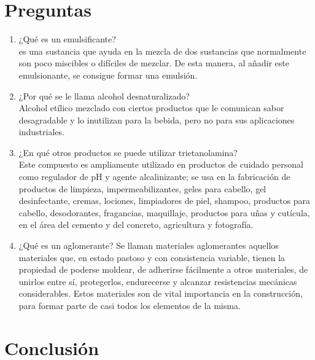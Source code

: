 \documentclass[12pt]{article}
\begin{document}
\section{Preguntas}
\begin{enumerate}
	\item ¿Qué es un emulsificante?\\
	es una sustancia que ayuda en la mezcla de dos sustancias que normalmente son poco miscibles o difíciles de mezclar. De esta manera, al añadir este emulsionante, se consigue formar una emulsión.
	\item ¿Por qué se le llama alcohol desnaturalizado?\\
	Alcohol etílico mezclado con ciertos productos que le comunican sabor desagradable y lo inutilizan para la bebida, pero no para sus aplicaciones industriales.
	\item ¿En qué otros productos se puede utilizar trietanolamina?\\
	Este compuesto es ampliamente utilizado en productos de cuidado personal como regulador de pH y agente alcalinizante; se usa en la fabricación de productos de limpieza, impermeabilizantes, geles para cabello, gel desinfectante, cremas, lociones, limpiadores de piel, shampoo, productos para cabello, desodorantes, fragancias, maquillaje, productos para uñas y cutícula, en el área del cemento y del concreto, agricultura y fotografía.
	\item ¿Qué es un aglomerante?
	Se llaman materiales aglomerantes aquellos materiales que, en estado pastoso y con consistencia variable, tienen la propiedad de poderse moldear, de adherirse fácilmente a otros materiales, de unirlos entre sí, protegerlos, endurecerse y alcanzar resistencias mecánicas considerables. Estos materiales son de vital importancia en la construcción, para formar parte de casi todos los elementos de la misma.
	
\end{enumerate}
\section{Conclusión}
\end{document}
